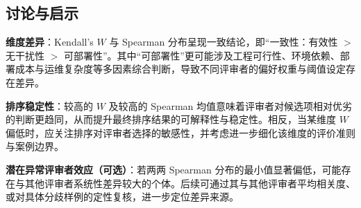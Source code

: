 \subsection{讨论与启示}
\textbf{维度差异}：Kendall’s $W$ 与 Spearman 分布呈现一致结论，即“一致性：有效性 $>$ 无干扰性 $>$ 可部署性”。其中“可部署性”更可能涉及工程可行性、环境依赖、部署成本与运维复杂度等多因素综合判断，导致不同评审者的偏好权重与阈值设定存在差异。

\textbf{排序稳定性}：较高的 $W$ 及较高的 Spearman 均值意味着评审者对候选项相对优劣的判断更趋同，从而提升最终排序结果的可解释性与稳定性。相反，当某维度 $W$ 偏低时，应关注排序对评审者选择的敏感性，并考虑进一步细化该维度的评价准则与案例边界。

\textbf{潜在异常评审者效应（可选）}：若两两 Spearman 分布的最小值显著偏低，可能存在与其他评审者系统性差异较大的个体。后续可通过其与其他评审者平均相关度、或对具体分歧样例的定性复核，进一步定位差异来源。

